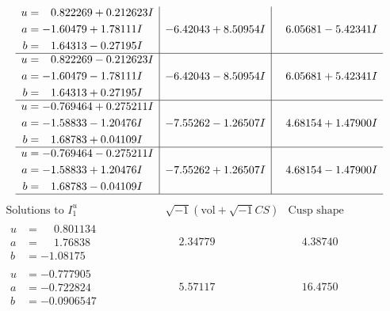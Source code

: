 \documentclass[1p]{elsarticle_modified}
\theoremstyle{definition}
\newcommand{\I}{\sqrt{-1}}
\begin{document}
$$\begin{array}{c|c|c}
\begin{aligned}
u &= \phantom{-}0.822269 + 0.212623 I \\
a &= -1.60479 + 1.78111 I \\
b &= \phantom{-}1.64313 - 0.27195 I\end{aligned}
 & -6.42043 + 8.50954 I & \phantom{-}6.05681 - 5.42341 I \\ \hline\begin{aligned}
u &= \phantom{-}0.822269 - 0.212623 I \\
a &= -1.60479 - 1.78111 I \\
b &= \phantom{-}1.64313 + 0.27195 I\end{aligned}
 & -6.42043 - 8.50954 I & \phantom{-}6.05681 + 5.42341 I \\ \hline\begin{aligned}
u &= -0.769464 + 0.275211 I \\
a &= -1.58833 - 1.20476 I \\
b &= \phantom{-}1.68783 + 0.04109 I\end{aligned}
 & -7.55262 - 1.26507 I & \phantom{-}4.68154 + 1.47900 I \\ \hline\begin{aligned}
u &= -0.769464 - 0.275211 I \\
a &= -1.58833 + 1.20476 I \\
b &= \phantom{-}1.68783 - 0.04109 I\end{aligned}
 & -7.55262 + 1.26507 I & \phantom{-}4.68154 - 1.47900 I\\
 \hline 
 \end{array}$$\newpage$$\begin{array}{c|c|c}  
\text{Solutions to }I^u_{1}& \I (\text{vol} + \sqrt{-1}CS) & \text{Cusp shape}\\
 \hline 
\begin{aligned}
u &= \phantom{-}0.801134\phantom{ +0.000000I} \\
a &= \phantom{-}1.76838\phantom{ +0.000000I} \\
b &= -1.08175\phantom{ +0.000000I}\end{aligned}
 & \phantom{-}2.34779\phantom{ +0.000000I} & \phantom{-}4.38740\phantom{ +0.000000I} \\ \hline\begin{aligned}
u &= -0.777905\phantom{ +0.000000I} \\
a &= -0.722824\phantom{ +0.000000I} \\
b &= -0.0906547\phantom{ +0.000000I}\end{aligned}
 & \phantom{-}5.57117\phantom{ +0.000000I} & \phantom{-}16.4750\phantom{ +0.000000I} \\ \hline\begin{aligned}

\end{aligned}
\end{array}$$
\end{document}
